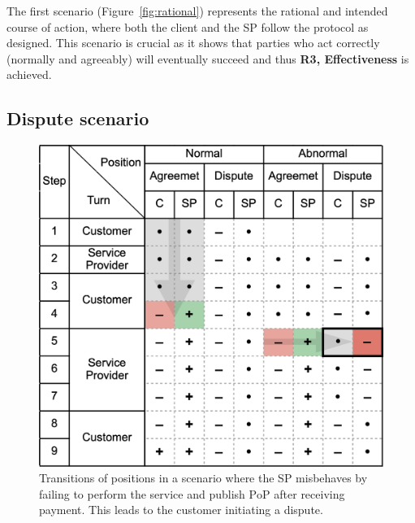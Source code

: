\documentclass[pdftex,twocolumn,epjc3]{svjour3}
\begin{document}
The first scenario (Figure~\ref{fig:rational}) represents the rational and intended course of action, where both the client and the SP follow the protocol as designed. This scenario is crucial as it shows that parties who act correctly (normally and agreeably) will eventually succeed and thus \textbf{R3, Effectiveness} is achieved.

\subsection{Dispute scenario}\label{sec:example-scenarios}

\begin{figure}[h!]
\includegraphics[width=\linewidth]{misbehaviour.png}
\centering
\caption{Transitions of positions in a scenario where the SP misbehaves by failing to perform the service and publish $\mathrm{PoP}$ after receiving payment. This leads to the customer initiating a dispute.}
\label{fig:misbehaviour}
\end{figure}
\end{document}
